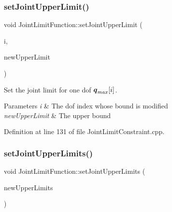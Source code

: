\hypertarget{classocra_1_1JointLimitFunction_a0f83df6fab80175c07070c00d26a41b5}{}\label{classocra_1_1JointLimitFunction_a0f83df6fab80175c07070c00d26a41b5} 
\subsubsection{\texorpdfstring{set\+Joint\+Upper\+Limit()}{setJointUpperLimit()}}
{\footnotesize\ttfamily void Joint\+Limit\+Function\+::set\+Joint\+Upper\+Limit (\begin{DoxyParamCaption}\item[{int}]{i,  }\item[{double}]{new\+Upper\+Limit }\end{DoxyParamCaption})}

Set the joint limit for one dof $ \mbox{\boldmath${q}$}_{max}[i] $.


\begin{DoxyParams}{Parameters}
{\em i} & The dof index whose bound is modified \\
\hline
{\em new\+Upper\+Limit} & The upper bound \\
\hline
\end{DoxyParams}


Definition at line 131 of file Joint\+Limit\+Constraint.\+cpp.

\hypertarget{classocra_1_1JointLimitFunction_a661a85585b10ec71cbbbe6cb12523507}{}\label{classocra_1_1JointLimitFunction_a661a85585b10ec71cbbbe6cb12523507} 
\subsubsection{\texorpdfstring{set\+Joint\+Upper\+Limits()}{setJointUpperLimits()}}
{\footnotesize\ttfamily void Joint\+Limit\+Function\+::set\+Joint\+Upper\+Limits (\begin{DoxyParamCaption}\item[{const Eigen\+::\+Vector\+Xd \&}]{new\+Upper\+Limits }\end{DoxyParamCaption})}

